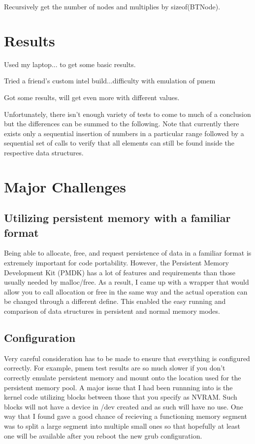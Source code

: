 \documentclass[twocolumn]{article}
\begin{document}
Recursively get the number of nodes and multiplies by sizeof(BTNode).

\section{Results}

Used my laptop... to get some basic results.

Tried a friend's custom intel build...difficulty with emulation of pmem

Got some results, will get even more with different values.

Unfortunately, there isn't enough variety of tests to come to much of a
conclusion but the differences can be summed to the following. Note that
currently there exists only a sequential insertion of numbers in a particular
range followed by a sequential set of calls to verify that all elements can
still be found inside the respective data structures.

\section{Major Challenges}

\subsection{Utilizing persistent memory with a familiar format}

Being able to allocate, free, and request persistence of data in a familiar
format is extremely important for code portability. However, the Persistent
Memory Development Kit (PMDK) has a lot of features and requirements than those
usually needed by malloc/free. As a result, I came up with a wrapper that would
allow you to call allocation or free in the same way and the actual operation
can be changed through a different define. This enabled the easy running and
comparison of data structures in persistent and normal memory modes.

\subsection{Configuration}

Very careful consideration has to be made to ensure that everything is
configured correctly. For example, pmem test results are so much slower if you
don't correctly emulate persistent memory and mount onto the location used for
the persistent memory pool. A major issue that I had been runnning into is the
kernel code utilizing blocks between those that you specify as NVRAM. Such
blocks will not have a device in /dev created and as such will have no use. One
way that I found gave a good chance of recieving a functioning memory segment
was to split a large segment into multiple small ones so that hopefully at
least one will be available after you reboot the new grub configuration.
\end{document}
